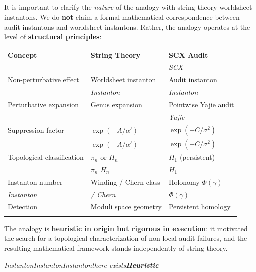 \documentclass[11pt,a4paper]{article}
\theoremstyle{plain}
\theoremstyle{definition}
\begin{document}
\subsection*{}

It is important to clarify the \emph{nature} of the analogy with string 
theory worldsheet instantons. We do \textbf{not} claim a formal 
mathematical correspondence between audit instantons and worldsheet 
instantons. Rather, the analogy operates at the level of \textbf{structural 
principles}:

\begin{center}
\begin{tabular}{@{}lll@{}}
\toprule
\textbf{Concept} & \textbf{String Theory} & \textbf{SCX Audit} \\
\textit{} & \textit{} & \textit{SCX} \\
\midrule
Non-perturbative effect & Worldsheet instanton & Audit instanton \\
\textit{} & \textit{Instanton} & \textit{Instanton} \\
\midrule
Perturbative expansion & Genus expansion & Pointwise Yajie audit \\
\textit{} & \textit{} & \textit{Yajie} \\
\midrule
Suppression factor & $\exp(-A/\alpha')$ & $\exp(-C/\sigma^2)$ \\
\textit{} & $\exp(-A/\alpha')$ & $\exp(-C/\sigma^2)$ \\
\midrule
Topological classification & $\pi_n$ or $H_n$ & $H_1$ (persistent) \\
\textit{} & $\pi_n$  $H_n$ & $H_1$ \\
\midrule
Instanton number & Winding / Chern class & Holonomy $\Phi(\gamma)$ \\
\textit{Instanton} & \textit{ / Chern} & \textit{ $\Phi(\gamma)$} \\
\midrule
Detection & Moduli space geometry & Persistent homology \\
\textit{} & \textit{} & \textit{} \\
\bottomrule
\end{tabular}
\end{center}

The analogy is \textbf{heuristic in origin but rigorous in execution}: it 
motivated the search for a topological characterization of non-local audit 
failures, and the resulting mathematical framework stands independently of 
string theory.

\bigskip
\noindent
\textit{Instanton\textbf{}\textbf{}InstantonInstantonthere exists\textbf{}\textbf{Heuristic}}
\end{document}
